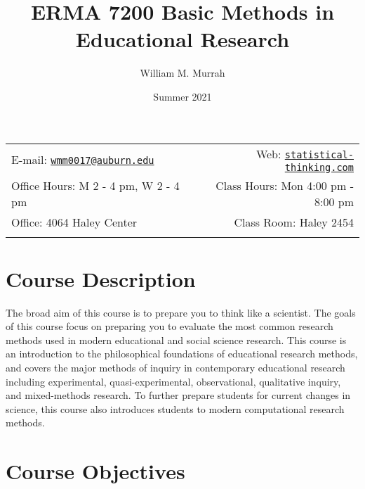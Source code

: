 \documentclass[11pt,]{article}
\title{ERMA 7200 Basic Methods in Educational Research}
\author{William M. Murrah}
\date{Summer 2021}
\begin{document}
  

\maketitle


\thispagestyle{firststyle}



\noindent \begin{tabular*}{\textwidth}{ @{\extracolsep{\fill}} lr @{\extracolsep{\fill}}}


E-mail: \texttt{\href{mailto:wmm0017@auburn.edu}{\nolinkurl{wmm0017@auburn.edu}}} & Web: \href{http://statistical-thinking.com}{\tt statistical-thinking.com}\\
Office Hours: M 2 - 4 pm, W 2 - 4 pm  &  Class Hours: Mon 4:00 pm - 8:00
pm\\
Office: 4064 Haley Center  & Class Room: Haley 2454\\
&  \\
\hline
\end{tabular*}

\vspace{2mm}



\hypertarget{course-description}{%
\section{Course Description}\label{course-description}}

The broad aim of this course is to prepare you to think like a
scientist. The goals of this course focus on preparing you to evaluate
the most common research methods used in modern educational and social
science research. This course is an introduction to the philosophical
foundations of educational research methods, and covers the major
methods of inquiry in contemporary educational research including
experimental, quasi-experimental, observational, qualitative inquiry,
and mixed-methods research. To further prepare students for current
changes in science, this course also introduces students to modern
computational research methods.

\hypertarget{course-objectives}{%
\section{Course Objectives}\label{course-objectives}}
\end{document}

